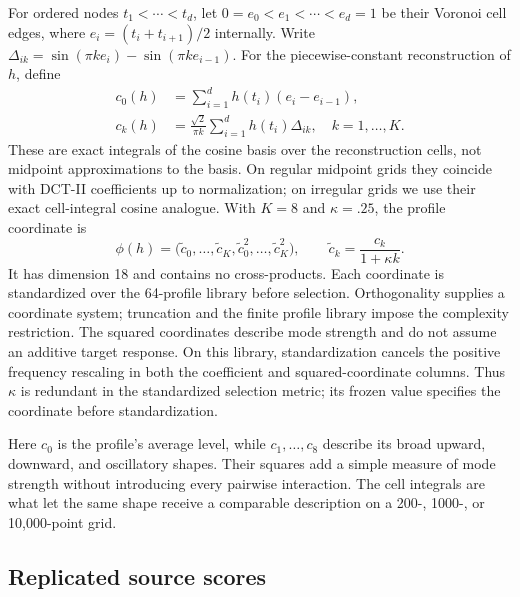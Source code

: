 For ordered nodes $t_1<\cdots<t_d$, let
$0=e_0<e_1<\cdots<e_d=1$ be their Voronoi cell edges, where
$e_i=(t_i+t_{i+1})/2$ internally.  Write
$\Delta_{ik}=\sin(\pi k e_i)-\sin(\pi k e_{i-1})$.  For the
piecewise-constant reconstruction of $h$, define
\begin{align}
 c_0(h)&=\sum_{i=1}^{d}h(t_i)(e_i-e_{i-1}),\label{eq:c0}\\
 c_k(h)&=\frac{\sqrt{2}}{\pi k}
 \sum_{i=1}^{d}h(t_i)\Delta_{ik},
 \quad k=1,\ldots,K.\label{eq:ck}
\end{align}
These are exact integrals of the cosine basis over the reconstruction cells,
not midpoint approximations to the basis.  On regular midpoint grids they
coincide with DCT-II coefficients up to normalization; on irregular grids we
use their exact cell-integral cosine analogue.  With $K=8$ and $\kappa=.25$,
the profile coordinate is
\begin{equation}\label{eq:profile-coordinate}
 \phi(h)=\bigl(\tilde c_0,\ldots,\tilde c_K,
                    \tilde c_0^2,\ldots,\tilde c_K^2\bigr),
 \qquad \tilde c_k=\frac{c_k}{1+\kappa k}.
\end{equation}
It has dimension 18 and contains no cross-products.  Each coordinate is
standardized over the 64-profile library before selection.
Orthogonality supplies a coordinate system; truncation and the finite profile
library impose the complexity restriction.  The squared coordinates describe
mode strength and do not assume an additive target response.
On this library, standardization cancels the positive frequency rescaling in
both the coefficient and squared-coordinate columns.  Thus $\kappa$ is
redundant in the standardized selection metric; its frozen value specifies
the coordinate before standardization.

Here $c_0$ is the profile's average level, while $c_1,\ldots,c_8$ describe
its broad upward, downward, and oscillatory shapes.  Their squares add a
simple measure of mode strength without introducing every pairwise
interaction.  The cell integrals are what let the same shape receive a
comparable description on a 200-, 1000-, or 10,000-point grid.

\subsection{Replicated source scores}

